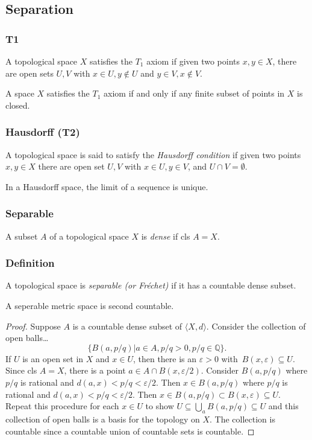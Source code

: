 \subsection{Separation}\label{separation}

\subsubsection{T1}\label{t1}
A topological space $X$ satisfies the $T_1$ axiom if given two points $x,y \in X$, there are open sets
$U,V$ with $x \in U, y \not\in U$ and $y \in V, x \not\in V$.

\begin{proposition}
A space $X$ satisfies the $T_1$ axiom if and only if any finite subset of points in $X$ is closed.
\end{proposition}

\subsubsection{Hausdorff (T2)}\label{t2}
A topological space is said to satisfy the \emph{Hausdorff condition} if given two points $x,y \in X$ there
are open set $U,V$ with $x \in U, y \in V$, and $U \cap V = \emptyset$.

\begin{theorem}
In a Hausdorff space, the limit of a sequence is unique.
\end{theorem}

\subsubsection{Separable}\label{separable}
\label{dense}
A subset $A$ of a topological space $X$ is \emph{dense} if cls $A = X$.

\subsubsection{Definition}\label{definition}
A topological space is \emph{separable (or Fr\'echet)} if it has a countable dense subset.

\begin{theorem}
A seperable metric space is second countable.
\end{theorem}

\begin{proof}
Suppose $A$ is a countable dense subset of $\langle X, d \rangle$. Consider the collection of open balls\dots
$$\{B(a,p/q) | a \in A, p/q > 0, p/q \in \mathbb{Q} \}.$$
If $U$ is an open set in $X$ and $x \in U$, then there is an $\varepsilon > 0$ with\ $B(x, \varepsilon) \subseteq U$.
Since cls $A = X$, there is a point $a \in A \cap B(x, \varepsilon / 2).$ Consider $B(a, p/q)$ where $p/q$ is rational
and $d(a,x) < p/q < \varepsilon / 2.$ Then $x \in B(a, p/q)$ where $p/q$ is rational and $d(a,x) < p/q < \varepsilon/2$.
Then $x \in B(a,p/q) \subset B(x,\varepsilon) \subseteq U$. Repeat this procedure for each $x \in U$ to show $U \subseteq \bigcup_{a}B(a,p/q) \subseteq U$
and this collection of open balls is a basis for the topology on $X$. The collection is countable since a countable union of countable sets is countable.
\end{proof}